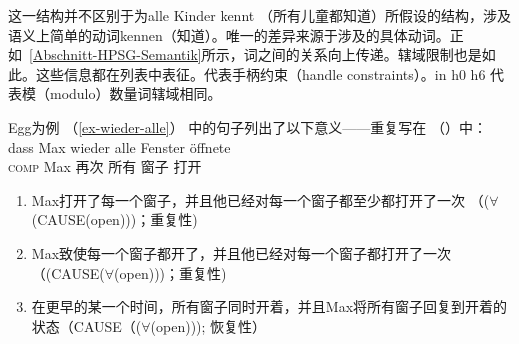 这一结构并不区别于为alle Kinder kennt （所有儿童都知道）所假设的结构，涉及语义上简单的动词kennen（知道）。唯一的差异来源于涉及的具体动词。正如~\ref{Abschnitt-HPSG-Semantik}所示，词之间的关系向上传递。辖域限制也是如此。这些信息都在列表中表征。\hcons 代表手柄约束（handle constraints）。\qeq in h0 \qeq h6 代表模（modulo）数量词辖域相同。

Egg为例 （\ref{ex-wieder-alle}） 中的句子列出了以下意义——重复写在 （）中：
\ea
\label{ex-wieder-alle-zwei}
\gll dass Max wieder alle Fenster öffnete\\
	 \textsc{comp} Max 再次 所有 窗子 打开\\
\z
\begin{enumerate}
\item Max打开了每一个窗子，并且他已经对每一个窗子都至少都打开了一次 （($\forall$(CAUSE(open)))；重复性)
\item Max致使每一个窗子都开了，并且他已经对每一个窗子都打开了一次 （(CAUSE($\forall$(open)))；重复性)
\item 在更早的某一个时间，所有窗子同时开着，并且Max将所有窗子回复到开着的状态（CAUSE（($\forall$(open))); 恢复性）
\end{enumerate}


